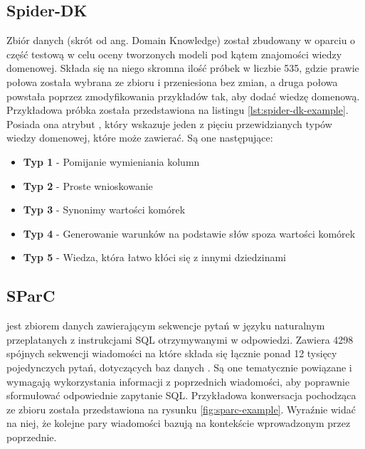 \subsection{Spider-DK}
Zbiór danych  (skrót od ang. Domain Knowledge) został zbudowany w oparciu o część testową  w celu oceny tworzonych modeli pod kątem znajomości wiedzy domenowej. Składa się na niego skromna ilość próbek w liczbie 535, gdzie prawie połowa została wybrana ze zbioru  i przeniesiona bez zmian, a druga połowa powstała poprzez zmodyfikowania przykładów tak, aby dodać wiedzę domenową. Przykładowa próbka została przedstawiona na listingu \ref{lst:spider-dk-example}. Posiada ona atrybut , który wskazuje jeden z pięciu przewidzianych typów wiedzy domenowej, które może zawierać. Są one następujące:
\begin{itemize}
    \item \textbf{Typ 1} - Pomijanie wymieniania kolumn
    \item \textbf{Typ 2} - Proste wnioskowanie
    \item \textbf{Typ 3} - Synonimy wartości komórek
    \item \textbf{Typ 4} - Generowanie warunków na podstawie słów spoza wartości komórek
    \item \textbf{Typ 5} - Wiedza, która łatwo kłóci się z innymi dziedzinami
\end{itemize}

\begin{minipage}{\linewidth}

\end{minipage}

\subsection{SParC}
 jest zbiorem danych zawierającym sekwencje pytań w języku naturalnym przeplatanych z instrukcjami SQL otrzymywanymi w odpowiedzi. Zawiera 4298 spójnych sekwencji wiadomości na które składa się łącznie ponad 12 tysięcy pojedynczych pytań, dotyczących baz danych . Są one tematycznie powiązane i wymagają wykorzystania informacji z poprzednich wiadomości, aby poprawnie sformułować odpowiednie zapytanie SQL. Przykładowa konwersacja pochodząca ze zbioru  została przedstawiona na rysunku \ref{fig:sparc-example}. Wyraźnie widać na niej, że kolejne pary wiadomości bazują na kontekście wprowadzonym przez poprzednie.

